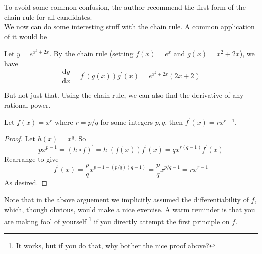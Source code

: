 To avoid some common confusion, the author recommend the first form of the chain rule for all candidates.\\
We now can do some interesting stuff with the chain rule.
A common application of it would be
\begin{example}
    Let $y=e^{x^2+2x}$. By the chain rule (setting $f(x)=e^x$ and $g(x)=x^2+2x$), we have
    $$\frac{\mathrm dy}{\mathrm dx}=f^\prime(g(x))g^\prime(x)=e^{x^2+2x}(2x+2)$$
\end{example}
But not just that.
Using the chain rule, we can also find the derivative of any rational power.
\begin{theorem}
    Let $f(x)=x^r$ where $r=p/q$ for some integers $p,q$, then $f^\prime(x)=rx^{r-1}$.
\end{theorem}
\begin{proof}
    Let $h(x)=x^q$.
    So
    $$px^{p-1}=(h\circ f)^\prime=h^\prime(f(x))f^\prime(x)=qx^{r(q-1)}f^\prime(x)$$
    Rearrange to give
    $$f^\prime(x)=\frac{p}{q}x^{p-1-(p/q)(q-1)}=\frac{p}{q}x^{p/q-1}=rx^{r-1}$$
    As desired.
\end{proof}
Note that in the above arguement we implicitly assumed the differentiability of $f$, which, though obvious, would make a nice exercise.
A warm reminder is that you are making fool of yourself
\footnote{It works, but if you do that, why bother the nice proof above?}
if you directly attempt the first principle on $f$.